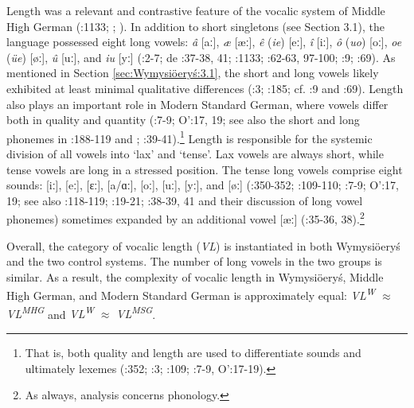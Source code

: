 \documentclass[output=paper]{langscibook}
\begin{document}
Length was a relevant and contrastive feature of the vocalic system of Middle High German (\citealt{Simmler1985}:1133; \citealt{Seiler2005}; \citealt{MoosmüllerBrandstätter2015}). In addition to short singletons (see Section 3.1), the language possessed eight long vowels: \textit{â} [aː], \textit{æ} [æː], \textit{ê} (\textit{ie}) [eː], \textit{î} [iː], \textit{ô} (\textit{uo}) [oː], \textit{oe} (\textit{üe}) [øː], \textit{û} [uː], and \textit{iu} [yː] (\citealt{Wright1917}:2-7; de \citealt{BoorWisniewski1973}:37-38, 41; \citealt{Simmler1985}:1133; \citealt{Paul2007}:62-63, 97-100; \citealt{Hall2017}:9; \citealt{Schmidt2017}:69). As mentioned in Section \ref{sec:Wymysiöeryś:3.1}, the short and long vowels likely exhibited at least minimal qualitative differences (\citealt{Wright1917}:3; \citealt{Caratini2009}:185; cf. \citealt{Hall2017}:9 and \citealt{Schmidt2017}:69). Length also plays an important role in Modern Standard German, where vowels differ both in quality and quantity (\citealt{Fagan2009}:7-9; O’\citealt{BrienFagan2016}:17, 19; see also the short and long phonemes in \citealt{Russ1994}:188-119 and \citealt{Wiese1996}; \citealt{Fox2005}:39-41).\footnote{That is, both quality and length are used to differentiate sounds and ultimately lexemes (\citealt{Eisenberg1994}:352; \citealt{DoddEtAl2003}:3; \citealt{JohnsonBraber2008}:109; \citealt{Fagan2009}:7-9, O’\citealt{BrienFagan2016}:17-19).} Length is responsible for the systemic division of all vowels into ‘lax’ and ‘tense’. Lax vowels are always short, while tense vowels are long in a stressed position. The tense long vowels comprise eight sounds: [iː], [eː], [ɛː], [a/ɑː], [oː], [uː], [yː], and [øː] (\citealt{Eisenberg1994}:350-352; \citealt{JohnsonBraber2008}:109-110; \citealt{Fagan2009}:7-9; O’\citealt{BrienFagan2016}:17, 19; see also \citealt{Russ1994}:118-119; \citealt{Wiese1996}:19-21; \citealt{Fox2005}:38-39, 41 and their discussion of long vowel phonemes) sometimes expanded by an additional vowel [æː] (\citealt{Fox2005}:35-36, 38).\footnote{As always,  analysis concerns phonology.}



Overall, the category of vocalic length (\textit{VL}) is instantiated in both Wymysiöeryś and the two control systems. The number of long vowels in the two groups is similar. As a result, the complexity of vocalic length in Wymysiöeryś, Middle High German, and Modern Standard German is approximately equal: \textit{VL\textsuperscript{W}} ${\approx}$ \textit{VL\textsuperscript{MHG} }and \textit{VL\textsuperscript{W}} ${\approx}$ \textit{VL\textsuperscript{MSG}}.
\end{document}
